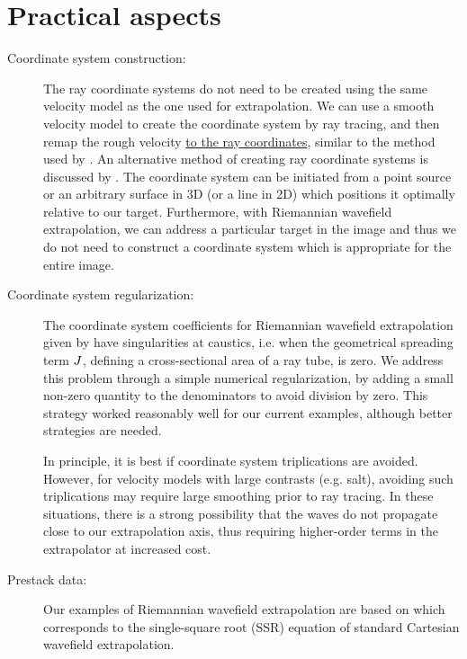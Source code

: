 \section{Practical aspects}
\begin{description}
\item[Coordinate system construction:]
The ray coordinate systems do not need to be created using the
same velocity model as the one used for extrapolation.
We can use a smooth velocity model to create the coordinate
system by ray tracing, and then remap the rough velocity
\uline{to the ray coordinates}, 
similar to the method used by \cite{BDEtgen-EAGE03}.
An alternative method of creating ray coordinate systems
is discussed by \cite{Shragge.segab.2004}.
The coordinate system can be initiated from a point source
or an arbitrary surface in 3D (or a line in 2D) which positions 
it optimally relative to our target.
Furthermore, with Riemannian wavefield extrapolation,
we can address a particular target
in the image and thus we do not need to construct a
coordinate system which is appropriate for the entire
image.
\item[Coordinate system regularization:]
The coordinate system coefficients for Riemannian wavefield 
extrapolation given by  have singularities at 
caustics, i.e. when the geometrical spreading term $J$,
defining a cross-sectional area of a ray tube, is zero.
We address this problem through a simple numerical
regularization, by adding a small non-zero quantity to the 
denominators to avoid division by zero. This strategy worked
reasonably well for our current examples, although better
strategies are needed.
\par
In principle, it is best if coordinate system 
triplications are avoided.
    However, for velocity models with large
    contrasts (e.g. salt), avoiding such triplications 
    may require large smoothing prior to ray tracing. 
    In these situations,
    there is a strong possibility that the waves do not
    propagate close to our extrapolation axis, thus requiring 
    higher-order terms in the extrapolator 
    at increased cost.
\item[Prestack data:]
Our examples of Riemannian wavefield extrapolation are based on
 which corresponds to the single-square root 
(SSR)
equation of standard Cartesian wavefield extrapolation.

\end{description}
